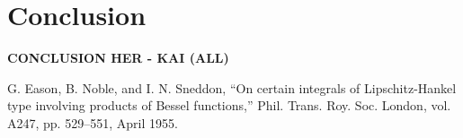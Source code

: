 \documentclass[conference]{IEEEtran}
\begin{document}
\section{Conclusion}
\textbf{CONCLUSION HER - KAI (ALL)}

\begin{thebibliography}{00}
 G. Eason, B. Noble, and I. N. Sneddon, ``On certain integrals of Lipschitz-Hankel type involving products of Bessel functions,'' Phil. Trans. Roy. Soc. London, vol. A247, pp. 529--551, April 1955.
\end{thebibliography}
\end{document}
